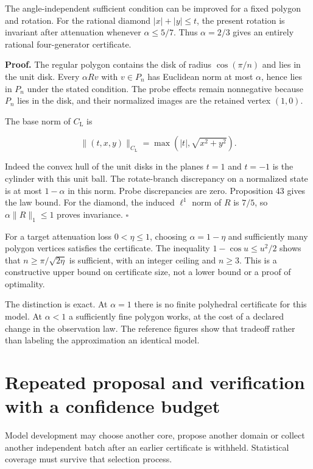 The angle-independent sufficient condition can be improved for a fixed
polygon and rotation. For the rational diamond \(|x|+|y|\leq t\), the
present rotation is invariant after attenuation whenever
\(\alpha\leq5/7\). Thus \(\alpha=2/3\) gives an entirely rational
four-generator certificate.

\textbf{Proof.} The regular polygon contains the disk of radius
\(\cos(\pi/n)\) and lies in the unit disk. Every \(\alpha Rv\) with
\(v\in P_n\) has Euclidean norm at most \(\alpha\), hence lies in
\(P_n\) under the stated condition. The probe effects remain nonnegative
because \(P_n\) lies in the disk, and their normalized images are the
retained vertex \((1,0)\).

The base norm of \(C_{\mathrm L}\) is

\[
\|(t,x,y)\|_{C_{\mathrm L}}=\max(|t|,\sqrt{x^2+y^2}).
\]

Indeed the convex hull of the unit disks in the planes \(t=1\) and
\(t=-1\) is the cylinder with this unit ball. The rotate-branch
discrepancy on a normalized state is at most \(1-\alpha\) in this norm.
Probe discrepancies are zero. Proposition 43 gives the law bound. For
the diamond, the induced \(\ell^1\) norm of \(R\) is \(7/5\), so
\(\alpha\|R\|_1\leq1\) proves invariance. \(\square\)

For a target attenuation loss \(0<\eta\leq1\), choosing
\(\alpha=1-\eta\) and sufficiently many polygon vertices satisfies the
certificate. The inequality \(1-\cos u\leq u^2/2\) shows that
\(n\geq\pi/\sqrt{2\eta}\) is sufficient, with an integer ceiling and
\(n\geq3\). This is a constructive upper bound on certificate size, not
a lower bound or a proof of optimality.

The distinction is exact. At \(\alpha=1\) there is no finite polyhedral
certificate for this model. At \(\alpha<1\) a sufficiently fine polygon
works, at the cost of a declared change in the observation law. The
reference figures show that tradeoff rather than labeling the
approximation an identical model.

\section{Repeated proposal and verification with a confidence budget}\label{LSM:repeated-proposal-and-verification-with-a-confidence-budget}

Model development may choose another core, propose another domain or
collect another independent batch after an earlier certificate is
withheld. Statistical coverage must survive that selection process.

